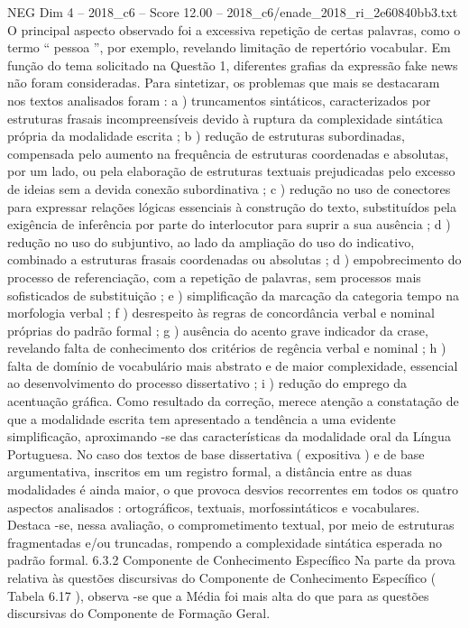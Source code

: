 \begin{textsample}{NEG Dim 4 – 2018\_c6 – Score 12.00 – 2018\_c6/enade\_2018\_ri\_2e60840bb3.txt}
O principal aspecto observado foi a excessiva repetição de certas palavras, como o termo “ pessoa ”, por exemplo, revelando limitação de repertório vocabular.
Em função do tema solicitado na Questão 1, diferentes grafias da expressão fake news não foram consideradas.
Para sintetizar, os problemas que mais se destacaram nos textos analisados foram : a ) truncamentos sintáticos, caracterizados por estruturas frasais incompreensíveis devido à ruptura da complexidade sintática própria da modalidade escrita ; b ) redução de estruturas subordinadas, compensada pelo aumento na frequência de estruturas coordenadas e absolutas, por um lado, ou pela elaboração de estruturas textuais prejudicadas pelo excesso de ideias sem a devida conexão subordinativa ; c ) redução no uso de conectores para expressar relações lógicas essenciais à construção do texto, substituídos pela exigência de inferência por parte do interlocutor para suprir a sua ausência ; d ) redução no uso do subjuntivo, ao lado da ampliação do uso do indicativo, combinado a estruturas frasais coordenadas ou absolutas ; d ) empobrecimento do processo de referenciação, com a repetição de palavras, sem processos mais sofisticados de substituição ; e ) simplificação da marcação da categoria tempo na morfologia verbal ; f ) desrespeito às regras de concordância verbal e nominal próprias do padrão formal ; g ) ausência do acento grave indicador da crase, revelando falta de conhecimento dos critérios de regência verbal e nominal ; h ) falta de domínio de vocabulário mais abstrato e de maior complexidade, essencial ao desenvolvimento do processo dissertativo ; i ) redução do emprego da acentuação gráfica.
Como resultado da correção, merece atenção a constatação de que a modalidade escrita tem apresentado a tendência a uma evidente simplificação, aproximando -se das características da modalidade oral da Língua Portuguesa.
No caso dos textos de base dissertativa ( expositiva ) e de base argumentativa, inscritos em um registro formal, a distância entre as duas modalidades é ainda maior, o que provoca desvios recorrentes em todos os quatro aspectos analisados : ortográficos, textuais, morfossintáticos e vocabulares.
Destaca -se, nessa avaliação, o comprometimento textual, por meio de estruturas fragmentadas e/ou truncadas, rompendo a complexidade sintática esperada no padrão formal. 6.3.2 Componente de Conhecimento Específico Na parte da prova relativa às questões discursivas do Componente de Conhecimento Específico ( Tabela 6.17 ), observa -se que a Média foi mais alta do que para as questões discursivas do Componente de Formação Geral.

\end{textsample}
